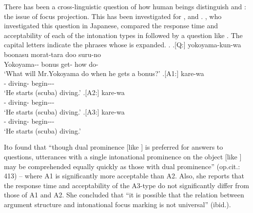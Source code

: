 There has been a cross-linguistic question of how
human beings distinguish  and :
the issue of focus projection.
This has been investigated for ,  and 
\cite{selkirk84,gussenhoven83}.
, who investigated this question in Japanese,
compared the response time and acceptability of each of the intonation types in \Next[A1-A3]
followed by a  question like \Next[Q].
The capital letters indicate the phrases whose  is expanded.
\ex.
 \ag.[Q:] yokoyama-kun-wa boonasu morat-tara doo suru-no \\
          Yokoyama-- bonus get- how do- \\
          `What will Mr.Yokoyama do when he gets a bonus?'
 \bg.[A1:] kare-wa   \\
           - diving- begin--- \\
           `He starts (scuba) diving.'
 \bg.[A2:] kare-wa   \\
           - diving- begin--- \\
           `He starts (scuba) diving.'
 \bg.[A3:] kare-wa   \\
           - diving- begin--- \\
           `He starts (scuba) diving.'
      \hfill{\cite[412]{ito02}}

Ito found that
``though dual prominence [like \Last[A1]] is preferred for answers to  questions,
utterances with a single intonational prominence on the object [like \Last[A2]] may be comprehended equally quickly as those with dual prominence'' (op.cit.: 413) -- 
where A1 is significantly more acceptable than A2.
Also, she reports that the response time and acceptability of the A3-type do not significantly differ from those of A1 and A2.
She concluded that
``it is possible that the relation between argument structure and intonational focus marking is not universal'' (ibid.).

